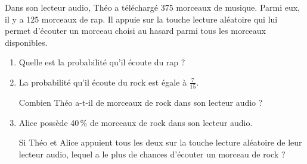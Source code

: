 
\medskip

Dans son lecteur audio, Théo a téléchargé 375 morceaux de musique. Parmi eux, il y a 125 morceaux de rap. Il appuie sur la touche \og lecture aléatoire\fg{} qui lui permet d'écouter un morceau choisi au hasard parmi tous les morceaux disponibles.
\medskip

\begin{enumerate}
\item Quelle est la probabilité qu'il écoute du rap ?
\item La probabilité qu'il écoute du rock est égale à $\frac{7}{15}$.

Combien Théo a-t-il de morceaux de rock dans son lecteur audio ?
\item  Alice possède 40\,\% de morceaux de rock dans son lecteur audio.

Si Théo et Alice appuient tous les deux sur la touche \og lecture aléatoire\fg{} de leur lecteur audio, lequel a le plus de chances d'écouter un morceau de rock ?
\end{enumerate}

\bigskip

